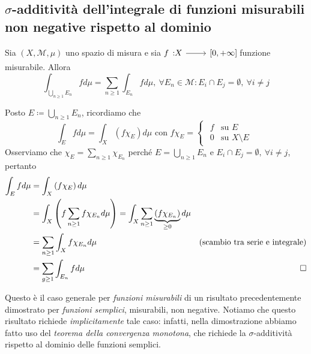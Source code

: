 \subsection{{$\sigma$}-additività dell'integrale di funzioni misurabili non negative rispetto al dominio}
\begin{proposition}
Sia $\left(X,\mathcal{M},\mu\right)$ uno spazio di misura e sia $\funz{f}{X}{\left[0,+\infty\right]}$ funzione misurabile.
Allora
\begin{equation}
	\int_{\bigcup_{n\geq 1}E_n}fd\mu=\sum_{n\geq 1}\int_{E_n}fd\mu,\ \forall E_n\in \mathcal{M}\colon E_i\cap E_j=\emptyset,\ \forall i\neq j
\end{equation}
\end{proposition}
\begin{demonstration}
	Posto $\displaystyle E\coloneqq \bigcup_{n\geq 1}E_n$, ricordiamo che
	\begin{equation*}
		\int_Efd\mu=\int_X\left(f\chi_E\right)d\mu\text{ con }f\chi_E=\begin{cases}
			\begin{array}{ll}
				f&\text{su }E\\
				0&\text{su }X\setminus E
			\end{array}
		\end{cases}
	\end{equation*}
Osserviamo che $\displaystyle \chi_E=\sum_{n\geq 1}\chi_{E_n}$ perché $\displaystyle E=\bigcup_{n\geq 1}E_n$ e $ E_i\cap E_j=\emptyset,\ \forall i\neq j$, pertanto
\begin{align*}
	\int_Efd\mu&=\int_X\left(f\chi_E\right)d\mu\\
	&=\int_X\left(f\sum_{n\geq 1}f\chi_{E_n}d\mu\right)=\int_X\sum_{n\geq 1}\underbrace{\left(f\chi_{E_n}\right)}_{\geq 0}d\mu\\
	&=\sum_{n\geq 1}\int_Xf\chi_{E_n}d\mu&\text{(scambio tra serie e integrale)}\\
	&=\sum_{g\geq 1}\int_{E_n}fd\mu&\qedhere
\end{align*}
\end{demonstration}
\begin{observe}
	Questo è il caso generale per \textit{funzioni misurabili} di un risultato precedentemente dimostrato per \textit{funzioni semplici}, misurabili, non negative. Notiamo che questo risultato richiede \textit{implicitamente} tale caso: infatti, nella dimostrazione abbiamo fatto uso del \textit{teorema della convergenza monotona}, che richiede la $\sigma$-additività rispetto al dominio delle funzioni semplici.
\end{observe}
